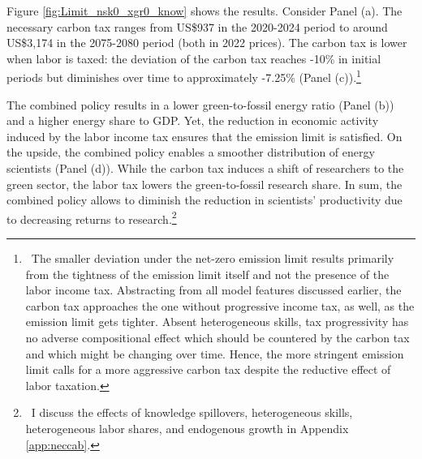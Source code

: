 \begin{figure}[h!!]
\begin{subfigure}[]{1\textwidth}
\begin{subfigure}[]{0.4\textwidth}
\end{subfigure}		
\end{subfigure}			
 \end{figure} 
 
 
Figure \ref{fig:Limit_nsk0_xgr0_know} shows the results.
Consider Panel (a). The necessary carbon tax ranges from US\$937  in the 2020-2024 period to around US\$3,174 in the 2075-2080 period (both in 2022 prices). The carbon tax is lower when labor is taxed: the deviation of the carbon tax reaches -10\% in initial periods but diminishes over time to approximately -7.25\% (Panel (c)).\footnote{\ The smaller deviation under the net-zero emission limit results primarily from the tightness of the emission limit itself and not the presence of the labor income tax. Abstracting from all model features discussed earlier, the carbon tax approaches the one without progressive income tax, as well, as the emission limit gets tighter. Absent heterogeneous skills, tax progressivity has no adverse compositional effect which should be countered by the carbon tax and which might be changing over time. Hence, the more stringent emission limit calls for a more aggressive carbon tax despite the reductive effect of labor taxation.}

The combined policy results in a lower green-to-fossil energy ratio (Panel (b)) and a higher energy share to GDP. Yet, the reduction in economic activity induced by the labor income tax ensures that the emission limit is satisfied. On the upside, the combined policy enables a smoother distribution of energy scientists (Panel (d)). While the carbon tax induces a shift of researchers to the green sector, the labor tax lowers the green-to-fossil research share. 
In sum, the combined policy allows to diminish the reduction in scientists' productivity due to decreasing returns to research.\footnote{\ I discuss the effects of knowledge spillovers, heterogeneous skills, heterogeneous labor shares, and endogenous growth in Appendix \ref{app:neccab}. }


